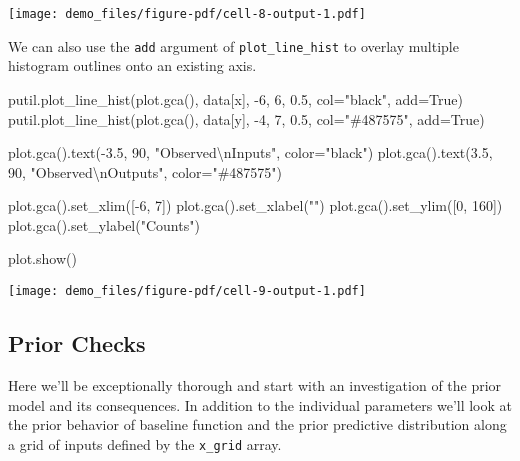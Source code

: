 \documentclass[
  letterpaper,
  DIV=11,
  numbers=noendperiod]{scrartcl}
\newenvironment{Shaded}{\begin{snugshade}}{\end{snugshade}}
\newcommand{\CharTok}[1]{\textcolor[rgb]{0.13,0.47,0.30}{#1}}
\newcommand{\DecValTok}[1]{\textcolor[rgb]{0.68,0.00,0.00}{#1}}
\newcommand{\FloatTok}[1]{\textcolor[rgb]{0.68,0.00,0.00}{#1}}
\newcommand{\NormalTok}[1]{\textcolor[rgb]{0.00,0.23,0.31}{#1}}
\newcommand{\OperatorTok}[1]{\textcolor[rgb]{0.37,0.37,0.37}{#1}}
\newcommand{\StringTok}[1]{\textcolor[rgb]{0.13,0.47,0.30}{#1}}
\newcommand{\VariableTok}[1]{\textcolor[rgb]{0.07,0.07,0.07}{#1}}
\begin{document}
\texttt{[image: demo\_files/figure-pdf/cell-8-output-1.pdf]}

We can also use the \texttt{add} argument of \texttt{plot\_line\_hist}
to overlay multiple histogram outlines onto an existing axis.

\begin{Shaded}
\begin{Highlighting}[]
\NormalTok{putil.plot\_line\_hist(plot.gca(), data[}\StringTok{\textquotesingle{}x\textquotesingle{}}\NormalTok{], }\OperatorTok{{-}}\DecValTok{6}\NormalTok{, }\DecValTok{6}\NormalTok{, }\FloatTok{0.5}\NormalTok{,}
\NormalTok{                     col}\OperatorTok{=}\StringTok{"black"}\NormalTok{, add}\OperatorTok{=}\VariableTok{True}\NormalTok{)}
\NormalTok{putil.plot\_line\_hist(plot.gca(), data[}\StringTok{\textquotesingle{}y\textquotesingle{}}\NormalTok{], }\OperatorTok{{-}}\DecValTok{4}\NormalTok{, }\DecValTok{7}\NormalTok{, }\FloatTok{0.5}\NormalTok{,}
\NormalTok{                     col}\OperatorTok{=}\StringTok{"\#487575"}\NormalTok{, add}\OperatorTok{=}\VariableTok{True}\NormalTok{)}

\NormalTok{plot.gca().text(}\OperatorTok{{-}}\FloatTok{3.5}\NormalTok{, }\DecValTok{90}\NormalTok{, }\StringTok{"Observed}\CharTok{\textbackslash{}n}\StringTok{Inputs"}\NormalTok{, color}\OperatorTok{=}\StringTok{"black"}\NormalTok{)}
\NormalTok{plot.gca().text(}\FloatTok{3.5}\NormalTok{, }\DecValTok{90}\NormalTok{, }\StringTok{"Observed}\CharTok{\textbackslash{}n}\StringTok{Outputs"}\NormalTok{, color}\OperatorTok{=}\StringTok{"\#487575"}\NormalTok{)}

\NormalTok{plot.gca().set\_xlim([}\OperatorTok{{-}}\DecValTok{6}\NormalTok{, }\DecValTok{7}\NormalTok{])}
\NormalTok{plot.gca().set\_xlabel(}\StringTok{""}\NormalTok{)}
\NormalTok{plot.gca().set\_ylim([}\DecValTok{0}\NormalTok{, }\DecValTok{160}\NormalTok{])}
\NormalTok{plot.gca().set\_ylabel(}\StringTok{"Counts"}\NormalTok{)}

\NormalTok{plot.show()}
\end{Highlighting}
\end{Shaded}

\texttt{[image: demo\_files/figure-pdf/cell-9-output-1.pdf]}

\subsection{Prior Checks}\label{prior-checks}

Here we'll be exceptionally thorough and start with an investigation of
the prior model and its consequences. In addition to the individual
parameters we'll look at the prior behavior of baseline function and the
prior predictive distribution along a grid of inputs defined by the
\texttt{x\_grid} array.
\end{document}
